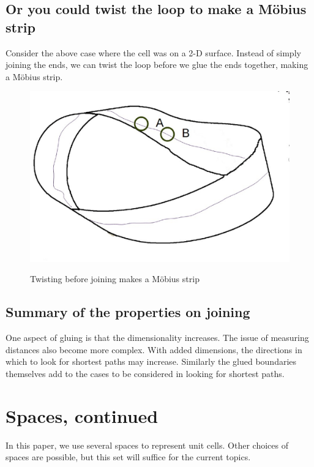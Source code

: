 \documentclass[preprint]{iucr}              %
\numberwithin{equation}{section}
\begin{document}
\subsection{Or you could twist the loop to make a M{\"o}bius strip}

Consider the above case where the cell was on a 2-D surface.
Instead of simply joining the ends, we can twist the loop before
we glue the ends together, making a M{\"o}bius strip.



\begin{figure}
	\includegraphics[height=0.45\textwidth]{mobius_1}
	\label{mobius_1}
	\caption{Twisting before joining makes a M{\"o}bius strip}
\end{figure}

\subsection{Summary of the properties on joining}

One aspect of gluing is that the dimensionality increases. The issue of measuring distances also 
become more complex. With added dimensions, the directions in which to look for shortest paths may increase. Similarly
the glued boundaries themselves add to the cases to
be considered in looking for shortest paths.
		
\section{Spaces, continued}

In this paper, we use several spaces to represent unit cells.
Other choices of spaces are possible, but this set will suffice 
for the current topics.
		
\end{document}

